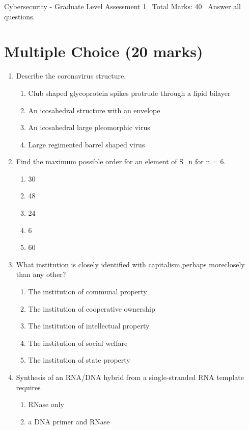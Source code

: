\documentclass[12pt]{article}
\begin{document}
\begin{center}
Cybersecurity - Graduate Level Assessment 1 \
Total Marks: 40 \
Answer all questions.
\end{center}

\section*{Multiple Choice (20 marks)}
\begin{enumerate}[label=\arabic*.]
\item Describe the coronavirus structure.
\begin{enumerate}[label=(\alph*)]
    \item Club shaped glycoprotein spikes protrude through a lipid bilayer
    \item An icosahedral structure with an envelope
    \item An icosahedral large pleomorphic virus
    \item Large regimented barrel shaped virus
\end{enumerate}
\item Find the maximum possible order for an element of S\_n for n = 6.
\begin{enumerate}[label=(\alph*)]
    \item 30
    \item 48
    \item 24
    \item 6
    \item 60
\end{enumerate}
\item What institution is closely identified with capitalism,perhaps moreclosely than any other?
\begin{enumerate}[label=(\alph*)]
    \item The institution of communal property
    \item The institution of cooperative ownership
    \item The institution of intellectual property
    \item The institution of social welfare
    \item The institution of state property
\end{enumerate}
\item Synthesis of an RNA/DNA hybrid from a single-stranded RNA template requires
\begin{enumerate}[label=(\alph*)]
    \item RNase only
    \item a DNA primer and RNase

\end{enumerate}
\end{enumerate}
\end{document}
